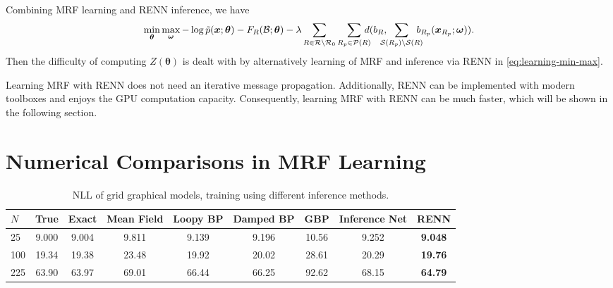 Combining MRF learning and RENN inference, we have
\begin{align}\label{eq:learning-min-max}
  \min_{\bm{\theta}}\max_{\bm{\omega}} -\log{\tilde{p}(\bm{x}; \bm{\theta})} - F_R(\Bb; \bm{\theta}) 
  -\lambda \sum_{R\in \Rr \backslash \Rr_0} \sum_{R_p \in \Pp(R)}\!\!\!\!\!d( b_R, \!\!\!\!\! \sum_{\Ss(R_p)\backslash \Ss(R)}\!\!\!\!\! b_{R_p}(\bm{x}_{R_p}; \bm{\omega})).
\end{align}
Then the difficulty of computing $Z(\bm{\theta})$ is dealt with by alternatively learning of MRF and inference via RENN in \eqref{eq:learning-min-max}.

Learning MRF with RENN does not need an iterative message propagation. Additionally, RENN can be implemented with modern toolboxes and enjoys the GPU computation capacity. Consequently, learning MRF with RENN can be much faster, which will be shown in the following section.


\section{Numerical Comparisons in MRF Learning}

\begin{table*}[t]
  \caption{NLL of grid graphical models, training using different inference methods.}
  \label{tab:nll-training-grid-n5n10}
  \begin{center}
    \begin{small}
      \setlength\tabcolsep{2pt}
      \begin{tabular}{lcccccccc}
        \toprule
        $N$ & True & Exact & Mean Field & Loopy BP & Damped BP & GBP & Inference Net & RENN \\
        \midrule
        25  &  9.000  &  9.004  &  9.811  &  {9.139}  &  9.196  &  10.56  &  9.252  &  \textbf{9.048}  \\
        100 &  19.34  &  19.38  &  23.48  &  {19.92}  &  20.02  &  28.61  &  20.29  &  \textbf{19.76} \\
        225 &  63.90  &  63.97  &  69.01  &  66.44    &  66.25  &  92.62  &  68.15  &  \textbf{64.79}  \\
        \bottomrule
      \end{tabular}
      
    \end{small}
  \end{center}
\end{table*}


